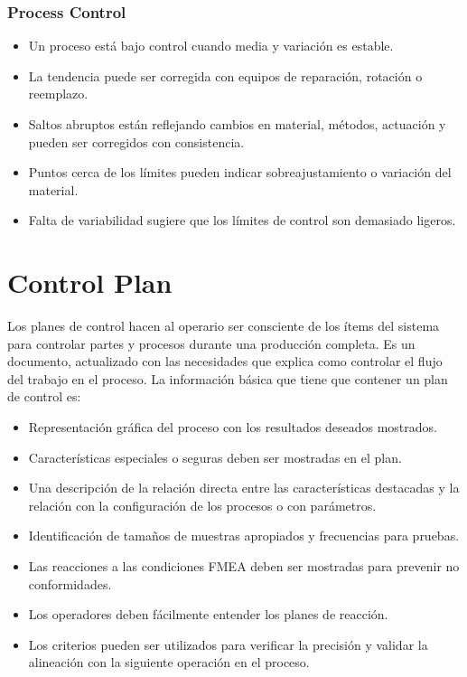 \documentclass[oneside]{book}
\begin{document}
\subsection{Process Control}
\begin{itemize}
	\item Un proceso está bajo control cuando media y variación es estable.
	\item La tendencia puede ser corregida con equipos de reparación, rotación o reemplazo.
	\item Saltos abruptos están reflejando cambios en material, métodos, actuación y pueden ser corregidos con consistencia.
	\item Puntos cerca de los límites pueden indicar sobreajustamiento o variación del material.
	\item Falta de variabilidad sugiere que los límites de control son demasiado ligeros.
\end{itemize}

\chapter{Control Plan}

Los planes de control hacen al operario ser consciente de los ítems del sistema para controlar partes y procesos durante una producción completa. Es un documento, actualizado con las necesidades que explica como controlar el flujo del trabajo en el proceso. La información básica que tiene que contener un plan de control es:
\begin{itemize}
	\item Representación gráfica del proceso con los resultados deseados mostrados.
	\item Características especiales o seguras deben ser mostradas en el plan.
	\item Una descripción de la relación directa entre las características destacadas y la relación con la configuración de los procesos o con parámetros.
	\item Identificación de tamaños de muestras apropiados y frecuencias para pruebas.
	\item Las reacciones a las condiciones FMEA deben ser mostradas para prevenir no conformidades.
	\item Los operadores deben fácilmente entender los planes de reacción.
	\item Los criterios pueden ser utilizados para verificar la precisión y validar la alineación con la siguiente operación en el proceso.
\end{itemize}
\end{document}
